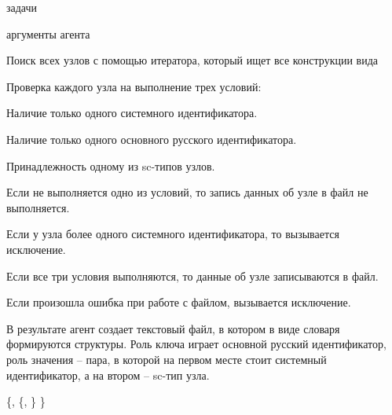 
\begin{scnrelfromvector}{задачи}
\end{scnrelfromvector}
\begin{scnrelfromvector}{аргументы агента}
\end{scnrelfromvector}
{
\begin{scnitemize}
    \item Поиск всех узлов с помощью итератора, который ищет все конструкции вида 
    \item Проверка каждого узла на выполнение трех условий:
        \begin{scnitemizeii}
            \item Наличие только одного системного идентификатора.
            \item Наличие только одного основного русского идентификатора.
            \item Принадлежность одному из sc-типов узлов.
        \end{scnitemizeii}
    \item Если не выполняется одно из условий, то запись данных об узле в файл не выполняется.
    \item Если у узла более одного системного идентификатора, то вызывается исключение.
    \item Если все три условия выполняются, то данные об узле записываются в файл.
    \item Если произошла ошибка при работе с файлом, вызывается исключение.
\end{scnitemize}
}
{В результате агент создает текстовый файл, в котором в виде словаря формируются структуры.
Роль ключа играет основной русский идентификатор, роль значения -- пара, в которой на первом месте стоит системный идентификатор, а на втором -- sc-тип узла.}
\begin{scnindent}
	{\{, \{, \} \}}
\end{scnindent}
